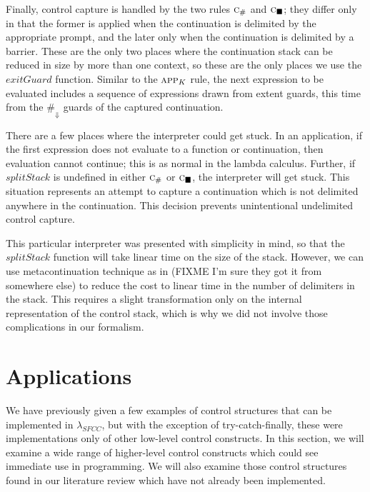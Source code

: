 \documentclass[11pt]{article}
\newcommand{\maybePage}{\newpage}
\begin{document}
Finally, control capture is handled by the two rules $\textsc{c}_\#$ and $\textsc{c}_\blacksquare$;
they differ only in that the former is applied when the continuation is delimited by the appropriate prompt, and the later only when the continuation is delimited by a barrier.
These are the only two places where the continuation stack can be reduced in size by more than one context, so these are the only places we use the $exitGuard$ function.
Similar to the $\textsc{app}_K$ rule, the next expression to be evaluated includes a sequence of expressions drawn from extent guards, this time from the $\#_\Downarrow$ guards of the captured continuation.

There are a few places where the interpreter could get stuck.
In an application, if the first expression does not evaluate to a function or continuation, then evaluation cannot continue; this is as normal in the lambda calculus.
Further, if $splitStack$ is undefined in either $\textsc{c}_\#$ or $\textsc{c}_\blacksquare$, the interpreter will get stuck.
This situation represents an attempt to capture a continuation which is not delimited anywhere in the continuation.
This decision prevents unintentional undelimited control capture.

This particular interpreter was presented with simplicity in mind, so that the $splitStack$ function will take linear time on the size of the stack.
However, we can use metacontinuation technique as in \cite{MFDC} (FIXME I'm sure they got it from somewhere else) to reduce the cost to linear time in the number of delimiters in the stack.
This requires a slight transformation only on the internal representation of the control stack, which is why we did not involve those complications in our formalism.

\maybePage
\section{Applications}
\label{sec:applications}

We have previously given a few examples of control structures that can be implemented in $\lambda_{SFCC}$, but with the exception of try-catch-finally, these were implementations only of other low-level control constructs.
In this section, we will examine a wide range of higher-level control constructs which could see immediate use in programming.
We will also examine those control structures found in our literature review which have not already been implemented.
\end{document}
